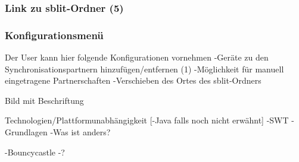 \subsubsection{Link zu sblit-Ordner (5)}

\subsubsection{Konfigurationsmenü}
Der User kann hier folgende Konfigurationen vornehmen
-Geräte zu den Synchronisationspartnern hinzufügen/entfernen (1)
-Möglichkeit für manuell eingetragene Partnerschaften
-Verschieben des Ortes des sblit-Ordners

{Bild mit Beschriftung}

%
%



Technologien/Plattformunabhängigkeit
[-Java falls noch nicht erwähnt]
-SWT
  -Grundlagen
  -Was ist anders?

-Bouncycastle
  -?